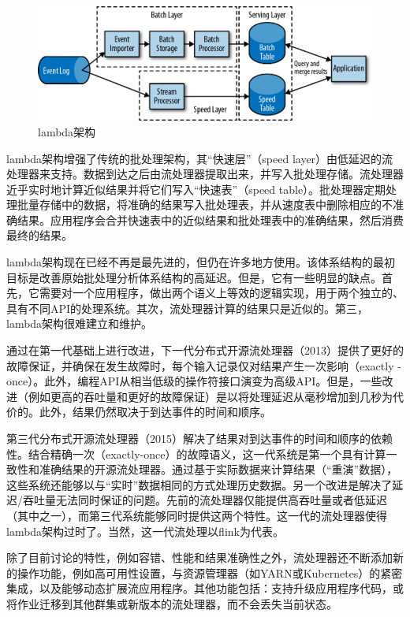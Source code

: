 \documentclass[cn,11pt,chinese]{elegantbook}
\begin{document}
\begin{figure}
\centering
\includegraphics{images/spaf_0107.png}
\caption{lambda架构}
\end{figure}

lambda架构增强了传统的批处理架构，其``快速层''（speed
layer）由低延迟的流处理器来支持。数据到达之后由流处理器提取出来，并写入批处理存储。流处理器近乎实时地计算近似结果并将它们写入``快速表''（speed
table）。批处理器定期处理批量存储中的数据，将准确的结果写入批处理表，并从速度表中删除相应的不准确结果。应用程序会合并快速表中的近似结果和批处理表中的准确结果，然后消费最终的结果。

lambda架构现在已经不再是最先进的，但仍在许多地方使用。该体系结构的最初目标是改善原始批处理分析体系结构的高延迟。但是，它有一些明显的缺点。首先，它需要对一个应用程序，做出两个语义上等效的逻辑实现，用于两个独立的、具有不同API的处理系统。其次，流处理器计算的结果只是近似的。第三，lambda架构很难建立和维护。

通过在第一代基础上进行改进，下一代分布式开源流处理器（2013）提供了更好的故障保证，并确保在发生故障时，每个输入记录仅对结果产生一次影响（exactly
-once）。此外，编程API从相当低级的操作符接口演变为高级API。但是，一些改进（例如更高的吞吐量和更好的故障保证）是以将处理延迟从毫秒增加到几秒为代价的。此外，结果仍然取决于到达事件的时间和顺序。

第三代分布式开源流处理器（2015）解决了结果对到达事件的时间和顺序的依赖性。结合精确一次（exactly-once）的故障语义，这一代系统是第一个具有计算一致性和准确结果的开源流处理器。通过基于实际数据来计算结果（``重演''数据），这些系统还能够以与``实时''数据相同的方式处理历史数据。另一个改进是解决了延迟/吞吐量无法同时保证的问题。先前的流处理器仅能提供高吞吐量或者低延迟（其中之一），而第三代系统能够同时提供这两个特性。这一代的流处理器使得lambda架构过时了。当然，这一代流处理以flink为代表。

除了目前讨论的特性，例如容错、性能和结果准确性之外，流处理器还不断添加新的操作功能，例如高可用性设置，与资源管理器（如YARN或Kubernetes）的紧密集成，以及能够动态扩展流应用程序。其他功能包括：支持升级应用程序代码，或将作业迁移到其他群集或新版本的流处理器，而不会丢失当前状态。
\end{document}
